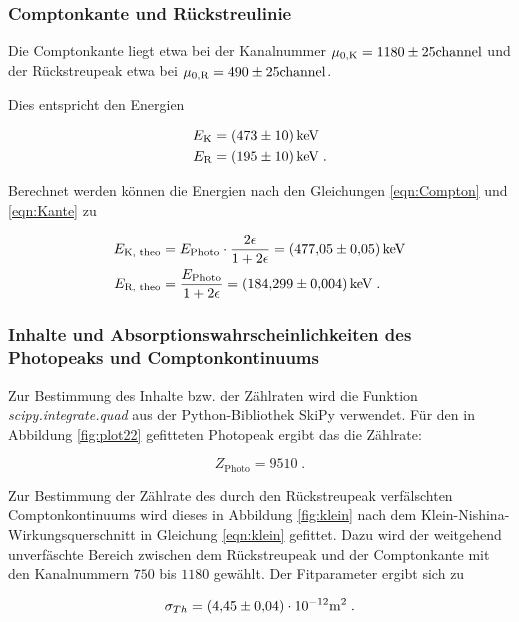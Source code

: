 \subsubsection{Comptonkante und Rückstreulinie}

Die Comptonkante liegt etwa bei der Kanalnummer $\mu_{0,\text{K}} = \num{1180 +- 25}\text{channel}$ und der Rückstreupeak etwa bei
$\mu_{0, \text{R}} = \num{490 +- 25}\text{channel}$.

Dies entspricht den Energien

\begin{align*}
  E_\text{K} &= \SI{473 +- 10}{\kilo\eV} \\
  E_\text{R} &= \SI{195 +- 10}{\kilo\eV} \; .
\end{align*}

Berechnet werden können die Energien nach den Gleichungen \eqref{eqn:Compton} und \eqref{eqn:Kante} zu

\begin{align*}
  E_\text{K, theo} &= E_\text{Photo} \cdot \frac{2 \epsilon}{1 + 2 \epsilon} = \SI{477.05 +- 0.05}{\kilo\eV} \\
  E_\text{R, theo} &= \frac{E_\text{Photo}}{1 + 2 \epsilon} =\SI{184.299 +- 0.004}{\kilo\eV} \; .
\end{align*}
 

\subsubsection{Inhalte und Absorptionswahrscheinlichkeiten des Photopeaks und Comptonkontinuums}

Zur Bestimmung des Inhalte bzw. der Zählraten wird die Funktion \textit{scipy.integrate.quad} 
aus der Python-Bibliothek SkiPy verwendet.
Für den in Abbildung \ref{fig:plot22} gefitteten Photopeak ergibt das die Zählrate:

\begin{equation*}
    Z_\text{Photo} = \num{9510} \; .
\end{equation*}

Zur Bestimmung der Zählrate des durch den Rückstreupeak verfälschten Comptonkontinuums wird dieses
in Abbildung \ref{fig:klein} nach dem Klein-Nishina-Wirkungsquerschnitt in Gleichung \eqref{eqn:klein} gefittet.
Dazu wird der weitgehend unverfäschte Bereich zwischen dem Rückstreupeak und der Comptonkante mit den
Kanalnummern $\num{750}$ bis $\num{1180}$ gewählt.
Der Fitparameter ergibt sich zu

\begin{equation*}
  \sigma_{Th} = (\num{4.45 +- 0.04})\cdot 10^{-12}\si{\square\meter} \; .
\end{equation*}

